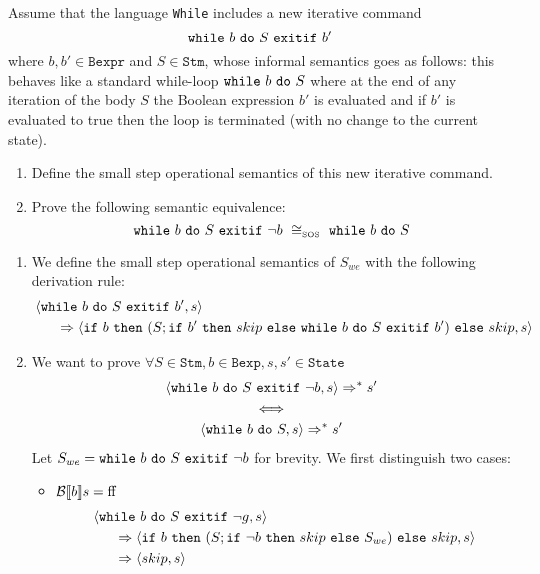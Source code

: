 \begin{exercise}{
    Assume that the language \texttt{While} includes a new iterative command
    \[ \texttt{while}\ b\ \texttt{do}\ S\ \texttt{exitif}\ b' \]
    where $b, b' \in \texttt{Bexpr}$ and $S \in \texttt{Stm}$, whose informal semantics goes as follows: this behaves like a standard while-loop $\texttt{while}\ b\ \texttt{do}\ S$ where at the end of any iteration of the body $S$ the Boolean expression $b'$ is evaluated and if $b'$ is evaluated to true then the loop is terminated (with no change to the current state).
    \begin{enumerate}
        \item Define the small step operational semantics of this new iterative command.
        \item Prove the following semantic equivalence:
        \[ \texttt{while}\ b\ \texttt{do}\ S\ \texttt{exitif}\ \neg b\ \cong_{\text{\tiny SOS}}\ \texttt{while}\ b\ \texttt{do}\ S \]
    \end{enumerate}
}
    \begin{enumerate}
        \item We define the small step operational semantics of $S_{we}$ with the following derivation rule:
            \begin{align*}
                &\left<\texttt{while}\ b\ \texttt{do}\ S\ \texttt{exitif}\ b', s\right>
                \\&\quad\ \ \Rightarrow \left<\texttt{if}\ b\ \texttt{then}\ (S; \texttt{if}\ b'\ \texttt{then}\ skip\ \texttt{else}\ \texttt{while}\ b\ \texttt{do}\ S\ \texttt{exitif}\ b')\ \texttt{else}\ skip, s\right>
            \end{align*}
        \item We want to prove $\forall S \in \texttt{Stm}, b \in \texttt{Bexp}, s, s' \in \texttt{State}$
            \begin{gather*}
                \left<\texttt{while}\ b\ \texttt{do}\ S\ \texttt{exitif}\ \neg b, s\right> \Rightarrow^* s' \\
                \iff \\
                \left<\texttt{while}\ b\ \texttt{do}\ S, s\right> \Rightarrow^* s'
            \end{gather*}
            Let $S_{we} = \texttt{while}\ b\ \texttt{do}\ S\ \texttt{exitif}\ \neg b$ for brevity.
            We first distinguish two cases:
            \begin{itemize}
                \item $\mathcal{B} \llbracket b \rrbracket s = \text{ff}$
                    \begin{align*}
                        &\instr{\wwexitif{b}{S}{\neg g}}{s}
                        \\&\quad\ \ \Rightarrow \instr{\wif{b}{(S; \wif{\neg b}{skip}{S_{we}})}{skip}}{s}
                        \\&\quad\ \ \Rightarrow \instr{skip}{s}

\end{align*}
\end{itemize}
\end{enumerate}
\end{exercise}
